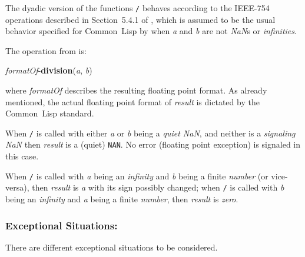 \documentclass[10pt,fleqn]{article}
\newcommand{\CL}{\textsf{Common~Lisp}}
\newcommand{\code}[1]{\texttt{#1}}
\newcommand{\clieeeterm}[1]{\textit{#1}}
\newcommand{\varname}[1]{\textit{#1}}
\newcommand{\clterm}[1]{\textit{#1}}
\newcommand{\IEEEFPStd}{IEEE-754}
\newcommand{\DExceptional}{\subsubsection*{Exceptional Situations:}}
\begin{document}
The dyadic version of the functions \code{/} behaves
according to the \IEEEFPStd{} operations described in Section~5.4.1 of
\cite{2008:IEEE-754}, which is assumed to be the usual behavior specified
for \CL{} by \cite{1996:ANSIHyperSpec} when \varname{a} and \varname{b} are
not \emph{NaN}s or \emph{infinities}.


\noindent
The operation from \cite{2008:IEEE-754} is:

\vspace*{3mm}

\noindent
\textit{formatOf}-\textbf{division}(\varname{a}, \varname{b})

\vspace*{3mm}

\noindent
where \textit{formatOf} describes the resulting floating point
format.  As already mentioned, the actual floating point format of
\varname{result} is dictated by the \CL{} standard.

When \code{/} is called with either \varname{a} or \varname{b} being a
\emph{quiet NaN}, and neither is a \emph{signaling NaN} then
\varname{result} is a (quiet) \code{NAN}.  No error (floating point
exception) is signaled in this case.

When \code{/} is called with \varname{a} being an 
\clieeeterm{infinity} and \varname{b} being a finite \clterm{number}
(or vice-versa), then \varname{result} is \varname{a} with its sign
possibly changed; when \code{/} is
called with \varname{b} being an \clieeeterm{infinity} and \varname{a}
being a finite \clterm{number}, then \varname{result}
is \clieeeterm{zero}.


\DExceptional{}

There are different exceptional situations to be considered.
\end{document}
